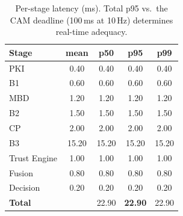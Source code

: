 \begin{table}[t]
\centering
\caption{Per-stage latency (ms). Total p95 vs.\ the CAM deadline (100\,ms at 10\,Hz) determines real-time adequacy.}
\label{tab:latency}
\begin{tabular}{lcccc}
\toprule
Stage & mean & p50 & p95 & p99 \\
\midrule
PKI & 0.40 & 0.40 & 0.40 & 0.40 \\
B1 & 0.60 & 0.60 & 0.60 & 0.60 \\
MBD & 1.20 & 1.20 & 1.20 & 1.20 \\
B2 & 1.50 & 1.50 & 1.50 & 1.50 \\
CP & 2.00 & 2.00 & 2.00 & 2.00 \\
B3 & 15.20 & 15.20 & 15.20 & 15.20 \\
Trust Engine & 1.00 & 1.00 & 1.00 & 1.00 \\
Fusion & 0.80 & 0.80 & 0.80 & 0.80 \\
Decision & 0.20 & 0.20 & 0.20 & 0.20 \\
\textbf{Total} &  & 22.90 & \textbf{22.90} & 22.90 \\
\bottomrule
\end{tabular}
\end{table}
